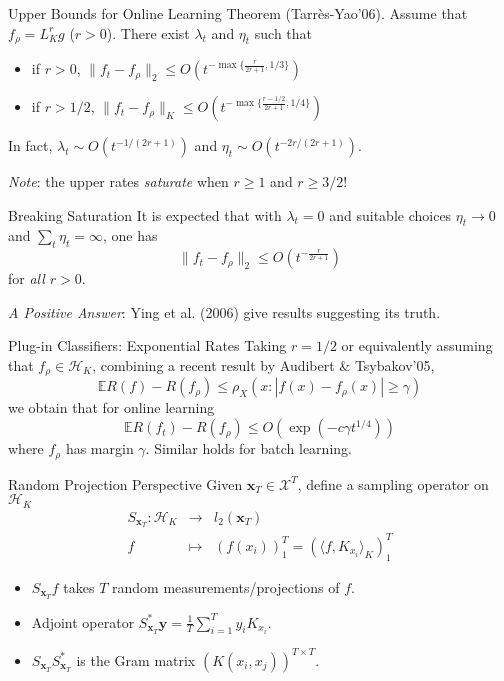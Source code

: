 \documentclass[pdf,slideColor,colorBG]{prosper}
\theoremstyle{theorem}
\theoremstyle{definition}
\theoremstyle{remark}
\newcommand{\DS}{\displaystyle}
\def\<{{\langle}}
\def\>{{\rangle}}
\def\E{{\mathbb E}}        %
\def\H{{\mathscr H}}
\def\X{{\mathcal X}}
\def\x{{\mathbf x}}
\def\y{{\mathbf y}}
\def\la{{\lambda}}
\begin{document}
%
\begin{slide}{Upper Bounds for Online Learning}
Theorem (Tarr\`es-Yao'06). Assume that $f_\rho = L_K^r g$ ($r>0$). There exist $\la_t$ and $\eta_t$ such that

\begin{itemize}
    \item if $r>0$, $\DS \|f_t - f_\rho \|_2 \leq O( t^{-\max\{\frac{r}{2r+1},1/3\}}) $
    \item if $r>1/2$, $\DS \|f_t - f_\rho \|_K \leq O( t^{-\max\{\frac{r-1/2}{2r+1},1/4\}})$
\end{itemize}
In fact, $\la_t \sim O(t^{-1/(2r+1)})$ and $\eta_t \sim O(t^{-2r/(2r+1)})$.

\medskip

\emph{Note}: the upper rates \emph{saturate} when $r\geq 1$ and $r\geq 3/2$!
\end{slide}

%
\begin{slide}{Breaking Saturation}
It is expected that with $\la_t=0$ and suitable choices $\eta_t\to 0$ and $\sum_t \eta_t =\infty$, one has
\[ \|f_t - f_\rho \|_2 \leq O(t^{-\frac{r}{2r+1}}) \]
for \emph{all $r>0$}.

\medskip

\emph{A Positive Answer}: Ying et al. (2006) give results suggesting its truth.
\end{slide}

%
\begin{slide}{Plug-in Classifiers: Exponential Rates}
Taking $r=1/2$ or equivalently assuming that $f_\rho\in \H_K$, combining a recent result by Audibert \& Tsybakov'05,
\[ \E R(f) - R(f_\rho) \leq \rho_X(x: |f(x) - f_\rho(x)|\geq \gamma) \]
we obtain that for online learning
\[\E R(f_t)-R(f_\rho) \leq O(\exp(-c \gamma t^{1/4})) \]
where $f_\rho$ has margin $\gamma$. Similar holds for batch learning.
\end{slide}

%
\begin{slide}{Random Projection Perspective}
Given $\x_T\in \X^T$, define a sampling operator on $\H_K$
\[
\begin{array}{rcl}
S_{\x_T} : \H_K & \to & l_2(\x_T) \\
f & \mapsto & (f(x_i))_1^T = (\<f,K_{x_i}\>_K)_1^T
\end{array}
\]
\begin{itemize}
    \item $S_{\x_T} f$ takes $T$ random measurements/projections of $f$.
    \item Adjoint operator $S_{\x_T}^\ast \y = \frac{1}{T}\sum_{i=1}^T y_i K_{x_i}$.
    \item $S_{\x_T} S_{\x_T}^\ast$ is the Gram matrix $(K(x_i,x_j))^{T\times T}$.
\end{itemize}
\end{slide}
\end{document}
